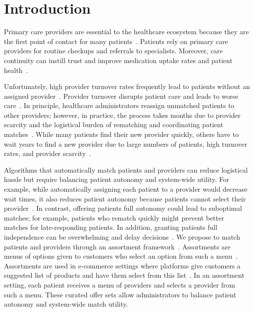 \section{Introduction}
\label{sec:intro}
Primary care providers are essential to the healthcare ecosystem because they are the first point of contact for many patients~\citep{physician_trust,physician_trust_adherence}. 
Patients rely on primary care providers for routine checkups and referrals to specialists. 
Moreover, care continuity can instill trust and improve medication uptake rates and patient health~\citep{physician_trust_adherence}. 

Unfortunately, high provider turnover rates frequently lead to patients without an assigned provider~\citep{pcp_turnover}. 
Provider turnover disrupts patient care and leads to worse care~\citep{pcp_turnover}. 
In principle, healthcare administrators reassign unmatched patients to other providers; however, in practice, the process takes months due to provider scarcity and the logistical burden of rematching and coordinating patient matches~\citep{finding_new_provider}.
While many patients find their new provider quickly, others have to wait years to find a new provider due to large numbers of patients, high turnover rates, and provider scarcity~\citep{finding_new_provider,provider_burnout}.

Algorithms that automatically match patients and providers can reduce logistical hassle but require balancing patient autonomy and system-wide utility. 
For example, while automatically assigning each patient to a provider would decrease wait times, it also reduces patient autonomy because patients cannot select their provider~\citep{patient_autonomy,gaynor_free_2016}. 
In contrast, offering patients full autonomy could lead to suboptimal matches; for example, patients who rematch quickly might prevent better matches for late-responding patients. 
In addition, granting patients full independence can be overwhelming and delay decisions~\citep{bate_choice_2005}. 
% 
We propose to match patients and providers through an assortment framework~\citep{assortment_school,assortment_dating,assortment_mnl}. 
Assortments are menus of options given to customers who select an option from such a menu~\citep{assortment_optimization}. 
Assortments are used in e-commerce settings where platforms give customers a suggested list of products and have them select from this list~\citep{e_commerce_assortment}. 
In an assortment setting, each patient receives a menu of providers and selects a provider from such a menu. 
These curated offer sets allow administrators to balance patient autonomy and system-wide match utility. 

